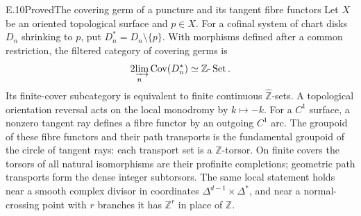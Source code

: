 \begin{statement}{E.10}{Proved}{The covering germ of a puncture and its tangent fibre functors}
Let $X$ be an oriented topological surface and $p\in X$.  For a
cofinal system of chart disks $D_n$ shrinking to $p$, put
$D_n^*=D_n\setminus\{p\}$.  With morphisms defined after a common
restriction, the filtered category of covering germs is
\[
 \operatorname*{2\!\varinjlim}_n\operatorname{Cov}(D_n^*)
       \simeq\mathbb Z\text{-}\operatorname{Set}.
\]
Its finite-cover subcategory is equivalent to finite continuous
$\widehat{\mathbb Z}$-sets.  A topological orientation reversal
acts on the local monodromy by $k\mapsto-k$.
For a $C^1$ surface, a nonzero tangent ray defines a fibre functor
by an outgoing $C^1$ arc.  The groupoid of these fibre functors
and their path transports is the fundamental groupoid of the circle
of tangent rays: each transport set is a $\mathbb Z$-torsor.
On finite covers the torsors of all natural isomorphisms are their
profinite completions; geometric path transports form the dense
integer subtorsors.
The same local statement holds near a smooth complex divisor in
coordinates $\Delta^{d-1}\times\Delta^*$, and near a normal-crossing
point with $r$ branches it has $\mathbb Z^r$ in place of $\mathbb Z$.
\end{statement}

